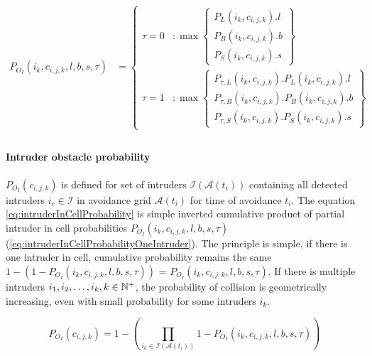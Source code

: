 \begin{equation}\label{eq:intruderInCellProbabilityOneIntruder}
    \begin{aligned}
        P_{O_I}(i_k,c_{i,j,k},l,b,s,\tau) & = \begin{cases}\tau=0&:\max\left\{\begin{aligned}P_L(i_k,c_{i,j,k}).l\\ P_B(i_k,c_{i,j,k}).b\\P_S(i_k,c_{i,j,k}).s\end{aligned}\right\}\\\tau=1&:\max\left\{\begin{aligned}P_{\tau,L}(i_k,c_{i,j,k}).P_L(i_k,c_{i,j,k}).l\\ P_{\tau,B}(i_k,c_{i,j,k}).P_B(i_k,c_{i,j,k}).b\\P_{\tau,S}(i_k,c_{i,j,k}).P_S(i_k,c_{i,j,k}).s\end{aligned}\right\}\end{cases} &\\
    \end{aligned}
\end{equation}

\paragraph{Intruder obstacle probability} $P_{O_I}(c_{i,j,k})$ is defined for set of intruders $\mathscr{I}(\mathscr{A}(t_i))$ containing all detected intruders $i_r\in\mathscr{I}$ in avoidance grid $\mathscr{A}(t_i)$ for time of avoidance $t_i$. The equation \ref{eq:intruderInCellProbability} is simple inverted cumulative product of partial intruder in cell probabilities $P_{O_I}(i_k,c_{i,j,k},l,b,s,\tau)$ (\ref{eq:intruderInCellProbabilityOneIntruder}). The principle is simple, if there is one intruder in cell, cumulative probability remains the same $1-(1-P_{O_I}(i_k,c_{i,j,k},l,b,s,\tau))$ = $P_{O_I}(i_k,c_{i,j,k},l,b,s,\tau)$. If there is multiple intruders $i_1,i_2,\dots,i_k,k\in\mathbb{N}^+$, the probability of collision is geometrically increasing, even with small probability for some intruders $i_k$.

\begin{equation}\label{eq:intruderInCellProbability}
    P_{O_I}(c_{i,j,k}) = 1-\left(\prod_{i_k\in\mathscr{I}(\mathscr{A}(t_i))}1-P_{O_I}(i_k,c_{i,j,k},l,b,s,\tau)\right)
\end{equation}

